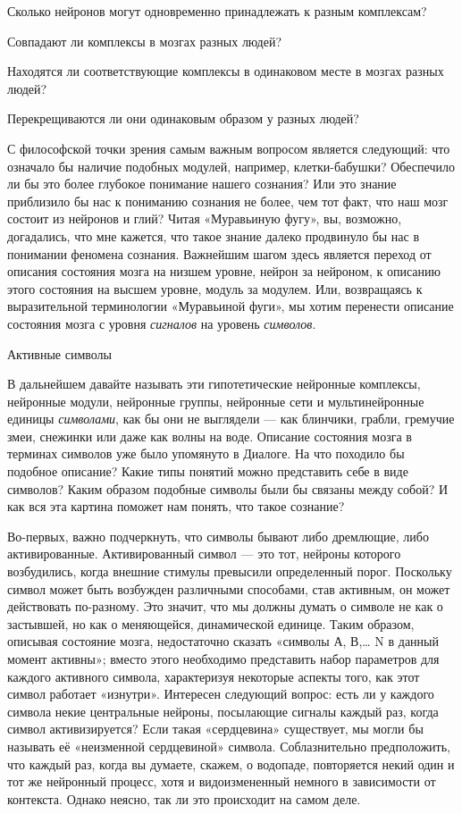 \documentclass[../main.tex]{subfiles}
\begin{document}
Сколько нейронов могут одновременно принадлежать к разным комплексам?

Совпадают ли комплексы в мозгах разных людей?

Находятся ли соответствующие комплексы в одинаковом месте в мозгах разных людей?

Перекрещиваются ли они одинаковым образом у разных людей?

С философской точки зрения самым важным вопросом является следующий: что означало бы наличие подобных модулей, например, клетки-бабушки? Обеспечило ли бы это более глубокое понимание нашего сознания? Или это знание приблизило бы нас к пониманию сознания не более, чем тот факт, что наш мозг состоит из нейронов и глий? Читая «Муравьиную фугу», вы, возможно, догадались, что мне кажется, что такое знание далеко продвинуло бы нас в понимании феномена сознания. Важнейшим шагом здесь является переход от описания состояния мозга на низшем уровне, нейрон за нейроном, к описанию этого состояния на высшем уровне, модуль за модулем. Или, возвращаясь к выразительной терминологии «Муравьиной фуги», мы хотим перенести описание состояния мозга с уровня \emph{сигналов} на уровень \emph{символов}.

Активные символы

В дальнейшем давайте называть эти гипотетические нейронные комплексы, нейронные модули, нейронные группы, нейронные сети и мультинейронные единицы \emph{символами}, как бы они не выглядели --- как блинчики, грабли, гремучие змеи, снежинки или даже как волны на воде. Описание состояния мозга в терминах символов уже было упомянуто в Диалоге. На что походило бы подобное описание? Какие типы понятий можно представить себе в виде символов? Каким образом подобные символы были бы связаны между собой? И как вся эта картина поможет нам понять, что такое сознание?

Во-первых, важно подчеркнуть, что символы бывают либо дремлющие, либо активированные. Активированный символ --- это тот, нейроны которого возбудились, когда внешние стимулы превысили определенный порог. Поскольку символ может быть возбужден различными способами, став активным, он может действовать по-разному. Это значит, что мы должны думать о символе не как о застывшей, но как о меняющейся, динамической единице. Таким образом, описывая состояние мозга, недостаточно сказать «символы А, В,\ldots{} N в данный момент активны»; вместо этого необходимо представить набор параметров для каждого активного символа, характеризуя некоторые аспекты того, как этот символ работает «изнутри». Интересен следующий вопрос: есть ли у каждого символа некие центральные нейроны, посылающие сигналы каждый раз, когда символ активизируется? Если такая «сердцевина» существует, мы могли бы называть её «неизменной сердцевиной» символа. Соблазнительно предположить, что каждый раз, когда вы думаете, скажем, о водопаде, повторяется некий один и тот же нейронный процесс, хотя и видоизмененный немного в зависимости от контекста. Однако неясно, так ли это происходит на самом деле.
\end{document}
